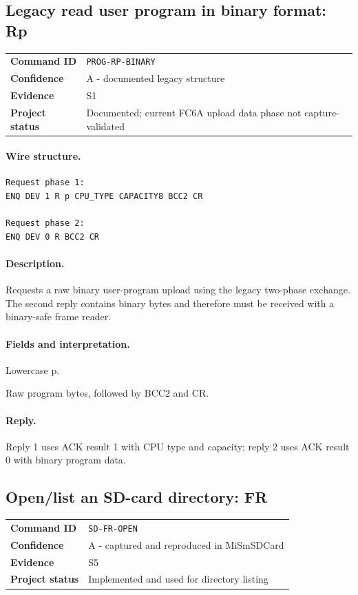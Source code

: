 \documentclass[10pt,letterpaper]{article}
\begin{document}
\subsection{Legacy read user program in binary format: Rp}
\begin{tabularx}{\textwidth}{@{}>{\bfseries}p{2.8cm}X@{}}
Command ID & \texttt{PROG-RP-BINARY} \\
Confidence & A - documented legacy structure \\
Evidence & S1 \\
Project status & Documented; current FC6A upload data phase not capture-validated \\
\end{tabularx}
\vspace{0.35em}
\paragraph{Wire structure.}
\begin{Verbatim}[breaklines=true,breakanywhere=true,fontsize=\small]
Request phase 1:
ENQ DEV 1 R p CPU_TYPE CAPACITY8 BCC2 CR

Request phase 2:
ENQ DEV 0 R BCC2 CR
\end{Verbatim}
\paragraph{Description.} Requests a raw binary user-program upload using the legacy two-phase exchange. The second reply contains binary bytes and therefore must be received with a binary-safe frame reader.
\paragraph{Fields and interpretation.}
\begin{description}[style=nextline,leftmargin=3.2cm,labelwidth=3.0cm,font=\normalfont\bfseries]
\item[Data type] Lowercase p.
\item[Reply 2] Raw program bytes, followed by BCC2 and CR.
\end{description}
\paragraph{Reply.} Reply 1 uses ACK result 1 with CPU type and capacity; reply 2 uses ACK result 0 with binary program data.

\subsection{Open/list an SD-card directory: FR}
\begin{tabularx}{\textwidth}{@{}>{\bfseries}p{2.8cm}X@{}}
Command ID & \texttt{SD-FR-OPEN} \\
Confidence & A - captured and reproduced in MiSmSDCard \\
Evidence & S5 \\
Project status & Implemented and used for directory listing \\
\end{tabularx}
\vspace{0.35em}
\end{document}
